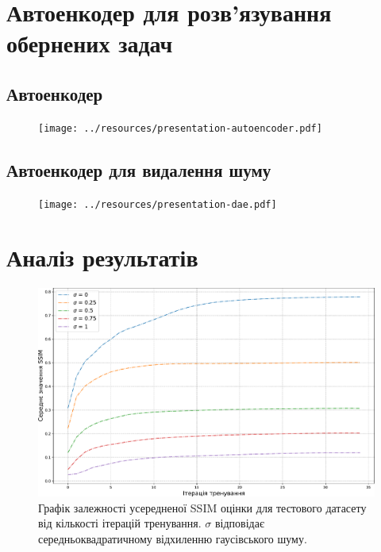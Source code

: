 \documentclass{beamer}
\numberwithin{equation}{section}
\begin{document}
	\section{Автоенкодер для розв'язування обернених задач}
	\subsection{Автоенкодер}
	\begin{frame}
	\end{frame}

	\begin{frame}
		\begin{figure}[H]
			\centering
			\texttt{[image: ../resources/presentation-autoencoder.pdf]}
			\label{fig:autoencoder}
		\end{figure}
	\end{frame}

	\subsection{Автоенкодер для видалення шуму}
	\begin{frame}
		\begin{figure}[H]
			\centering
			\texttt{[image: ../resources/presentation-dae.pdf]}
			\caption{}
			\label{fig:danoising-autoencoder}
		\end{figure}
	\end{frame}
	\section{Аналіз результатів}

	\begin{frame}
		\begin{figure}[H]
			\centering
			\includegraphics[width=1\textwidth]{../resources/awgn-train-ssim-comparation.pdf}
			\caption{Графік залежності усередненої SSIM оцінки для тестового датасету від кількості ітерацій тренування. $\sigma$ відповідає середньоквадратичному відхиленню гаусівського шуму.}
			\label{fig:awgn-train-ssim-comparation}
		\end{figure}
	\end{frame}
		
\end{document}
